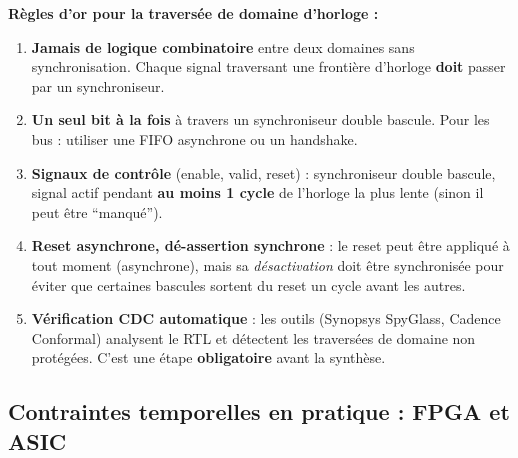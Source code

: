 \documentclass[12pt,a4paper,twoside]{book}
\begin{document}
\begin{pratique}
\textbf{Règles d'or pour la traversée de domaine d'horloge :}

\begin{enumerate}[nosep]
\item \textbf{Jamais de logique combinatoire} entre deux domaines sans synchronisation. Chaque signal traversant une frontière d'horloge \textbf{doit} passer par un synchroniseur.
\item \textbf{Un seul bit à la fois} à travers un synchroniseur double bascule. Pour les bus : utiliser une FIFO asynchrone ou un handshake.
\item \textbf{Signaux de contrôle} (enable, valid, reset) : synchroniseur double bascule, signal actif pendant \textbf{au moins 1 cycle} de l'horloge la plus lente (sinon il peut être ``manqué'').
\item \textbf{Reset asynchrone, dé-assertion synchrone} : le reset peut être appliqué à tout moment (asynchrone), mais sa \textit{désactivation} doit être synchronisée pour éviter que certaines bascules sortent du reset un cycle avant les autres.
\item \textbf{Vérification CDC automatique} : les outils (Synopsys SpyGlass, Cadence Conformal) analysent le RTL et détectent les traversées de domaine non protégées. C'est une étape \textbf{obligatoire} avant la synthèse.
\end{enumerate}
\end{pratique}

\subsection{Contraintes temporelles en pratique : FPGA et ASIC}
\end{document}
